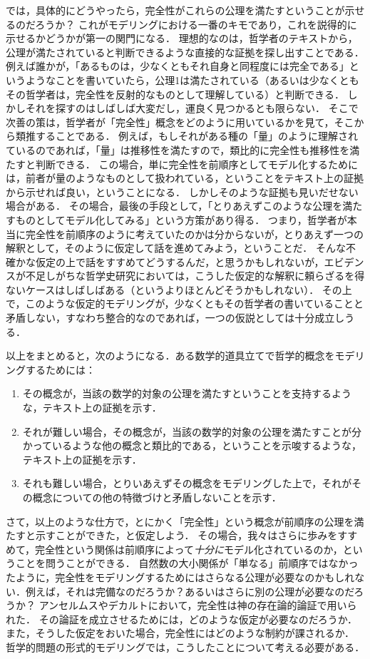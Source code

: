 \documentclass[11pt,a4paper]{jsarticle}
\begin{document}
では，具体的にどうやったら，完全性がこれらの公理を満たすということが示せるのだろうか？
これがモデリングにおける一番のキモであり，これを説得的に示せるかどうかが第一の関門になる．
理想的なのは，哲学者のテキストから，公理が満たされていると判断できるような直接的な証拠を探し出すことである．
例えば誰かが，「あるものは，少なくともそれ自身と同程度には完全である」というようなことを書いていたら，公理1は満たされている（あるいは少なくともその哲学者は，完全性を反射的なものとして理解している）と判断できる．
しかしそれを探すのはしばしば大変だし，運良く見つかるとも限らない．
そこで次善の策は，哲学者が「完全性」概念をどのように用いているかを見て，そこから類推することである．
例えば，もしそれがある種の「量」のように理解されているのであれば，「量」は推移性を満たすので，類比的に完全性も推移性を満たすと判断できる．
この場合，単に完全性を前順序としてモデル化するためには，前者が量のようなものとして扱われている，ということをテキスト上の証拠から示せれば良い，ということになる．
しかしそのような証拠も見いだせない場合がある．
その場合，最後の手段として，「とりあえずこのような公理を満たすものとしてモデル化してみる」という方策があり得る．
つまり，哲学者が本当に完全性を前順序のように考えていたのかは分からないが，とりあえず一つの解釈として，そのように仮定して話を進めてみよう，ということだ．
そんな不確かな仮定の上で話をすすめてどうするんだ，と思うかもしれないが，エビデンスが不足しがちな哲学史研究においては，こうした仮定的な解釈に頼らざるを得ないケースはしばしばある（というよりほとんどそうかもしれない）．
その上で，このような仮定的モデリングが，少なくともその哲学者の書いていることと矛盾しない，すなわち整合的なのであれば，一つの仮説としては十分成立しうる．

以上をまとめると，次のようになる．ある数学的道具立てで哲学的概念をモデリングするためには：
\begin{enumerate}
 \item その概念が，当該の数学的対象の公理を満たすということを支持するような，テキスト上の証拠を示す．
 \item それが難しい場合，その概念が，当該の数学的対象の公理を満たすことが分かっているような他の概念と類比的である，ということを示唆するような，テキスト上の証拠を示す．
 \item それも難しい場合，とりいあえずその概念をモデリングした上で，それがその概念についての他の特徴づけと矛盾しないことを示す．
\end{enumerate}

さて，以上のような仕方で，とにかく「完全性」という概念が前順序の公理を満たすと示すことができた，と仮定しよう．
その場合，我々はさらに歩みをすすめて，完全性という関係は前順序によって\emph{十分に}モデル化されているのか，ということを問うことができる．
自然数の大小関係が「単なる」前順序ではなかったように，完全性をモデリングするためにはさらなる公理が必要なのかもしれない．例えば，それは完備なのだろうか？あるいはさらに別の公理が必要なのだろうか？
アンセルムスやデカルトにおいて，完全性は神の存在論的論証で用いられた．
その論証を成立させるためには，どのような仮定が必要なのだろうか．
また，そうした仮定をおいた場合，完全性にはどのような制約が課されるか．
哲学的問題の形式的モデリングでは，こうしたことについて考える必要がある．
\end{document}

